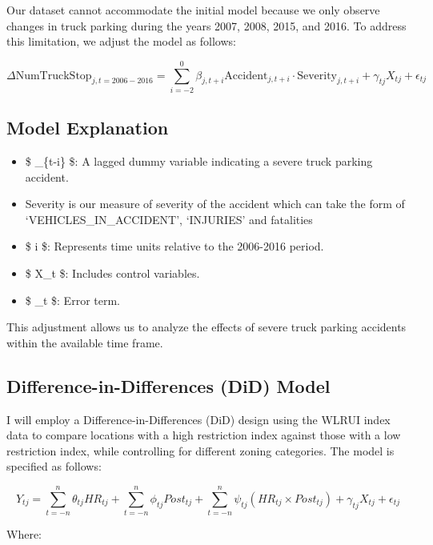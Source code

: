 \documentclass[
  12pt]{article}
\providecommand{\tightlist}{%
  \setlength{\itemsep}{0pt}\setlength{\parskip}{0pt}}\usepackage{longtable,booktabs,array}
\begin{document}
Our dataset cannot accommodate the initial model because we only observe
changes in truck parking during the years 2007, 2008, 2015, and 2016. To
address this limitation, we adjust the model as follows:

\[ \Delta \text{NumTruckStop}_{j,t=2006-2016} = \sum_{i=-2}^{0} \beta_{j,t+i} \text{Accident}_{j,t+i}\cdot \text{Severity}_{j,t+i} + \gamma_{tj} X_{tj} + \epsilon_{tj} \]

\subsection{Model Explanation}\label{model-explanation}

\begin{itemize}
\tightlist
\item
  \$ \_\{t-i\} \$: A lagged dummy variable indicating a severe
  truck parking accident.
\item
  Severity is our measure of severity of the accident which can take the
  form of `VEHICLES\_IN\_ACCIDENT', `INJURIES' and fatalities
\item
  \$ i \$: Represents time units relative to the 2006-2016 period.
\item
  \$ X\_t \$: Includes control variables.
\item
  \$ \epsilon\_t \$: Error term.
\end{itemize}

This adjustment allows us to analyze the effects of severe truck parking
accidents within the available time frame.

\subsection{Difference-in-Differences (DiD)
Model}\label{difference-in-differences-did-model}

I will employ a Difference-in-Differences (DiD) design using the WLRUI
index data to compare locations with a high restriction index against
those with a low restriction index, while controlling for different
zoning categories. The model is specified as follows:

\[ Y_{tj} = \sum_{t=-n}^{n} \theta_{tj} HR_{tj} + \sum_{t=-n}^{n} \phi_{tj} Post_{tj} + \sum_{t=-n}^{n} \psi_{tj} (HR_{tj} \times Post_{tj}) + \gamma_{tj} X_{tj} + \epsilon_{tj} \]

Where:
\end{document}
